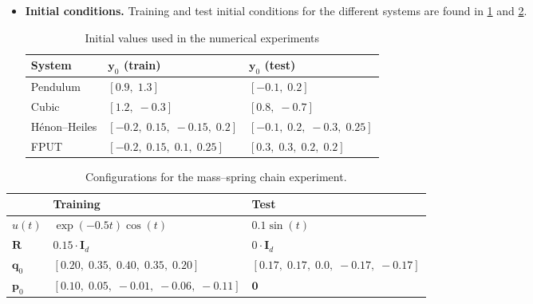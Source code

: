 \documentclass[11pt, a4paper]{article}
\theoremstyle{plain}
\theoremstyle{definition}
\theoremstyle{remark}
\begin{document}
\begin{itemize}
  \item \textbf{Initial conditions.}
    Training and test initial conditions for the different systems are found in \cref{tab:inits} and \cref{tab:train-test-settings}.
\begin{table}[ht]
    \caption{Initial values used in the numerical experiments}
    \label{tab:inits}
\centering
\renewcommand{\arraystretch}{1.3}
    \begin{tabular}{lll}
      \toprule
      System & $\mathbf{y}_0$ (train) & $\mathbf{y}_0$ (test) \\
      \midrule
      Pendulum       & $[0.9,\;1.3]$                        & $[-0.1,\;0.2]$ \\
      Cubic          & $[1.2,\;-0.3]$                       & $[0.8,\;-0.7]$ \\
      Hénon--Heiles  & $[-0.2,\;0.15,\;-0.15,\;0.2]$       & $[-0.1,\;0.2,\;-0.3,\;0.25]$ \\
      FPUT           & $[-0.2,\;0.15,\;0.1,\;0.25]$         & $[0.3,\;0.3,\;0.2,\;0.2]$ \\
      \bottomrule
    \end{tabular}
    \end{table}

\end{itemize}

\begin{table}[!h]
\caption{Configurations for the mass--spring chain experiment.}
\label{tab:train-test-settings}
\centering
\begin{tabular}{lll}
\toprule
 &Training & Test\\
\midrule
$u(t)$ &
$\exp(-0.5t)\cos(t)$ &
$0.1\sin(t)$ \\

$\mathbf{R}$ &
$0.15\cdot \mathbf{I}_d$ &
$0\cdot \mathbf{I}_d$ \\

$\mathbf{q}_0$ &
$[0.20,\;0.35,\;0.40,\;0.35,\;0.20]$ &
$[0.17,\;0.17,\;0.0,\;-0.17,\;-0.17]$ \\

$\mathbf{p}_0$ &
$[0.10,\;0.05,\;-0.01,\;-0.06,\;-0.11]$ &
$\mathbf{0}$ \\
\bottomrule
\end{tabular}
\end{table}
\end{document}
